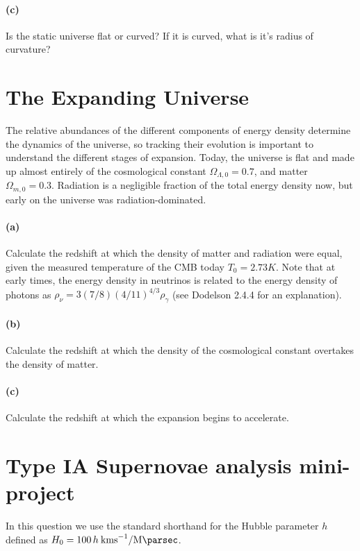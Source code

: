 \documentclass[12pt]{article}
\begin{document}
\paragraph{(c)} Is the static universe flat or curved? If it is curved, what is
it's radius of curvature?


\section{The Expanding Universe}

The relative abundances of the different components of energy density determine
the dynamics of the universe, so tracking their evolution is important to
understand the different stages of expansion. Today, the universe is flat and
made up almost entirely of the cosmological constant $\Omega_{\Lambda, 0} =
0.7$, and matter $\Omega_{m,0} = 0.3$. Radiation is a negligible fraction of the
total energy density now, but early on the universe was radiation-dominated.

\paragraph{(a)} Calculate the redshift at which the density of matter and
radiation were equal, given the measured temperature of the CMB today $T_0 =
2.73 K$. Note that at early times, the energy density in neutrinos is related to
the energy density of photons as $\rho_\nu = 3 (7/8) (4/11)^{4/3} \rho_\gamma$
(see Dodelson 2.4.4 for an explanation).

\paragraph{(b)} Calculate the redshift at which the density of the cosmological
constant overtakes the density of matter.

\paragraph{(c)} Calculate the redshift at which the expansion begins to
accelerate.

\section{Type IA Supernovae analysis mini-project}

In this question we use the standard shorthand for the Hubble parameter $h$ defined as $H_0 = 100\,h\:\si{\kilo\metre\second^{-1}\per\mega\parsec}$.
\end{document}
